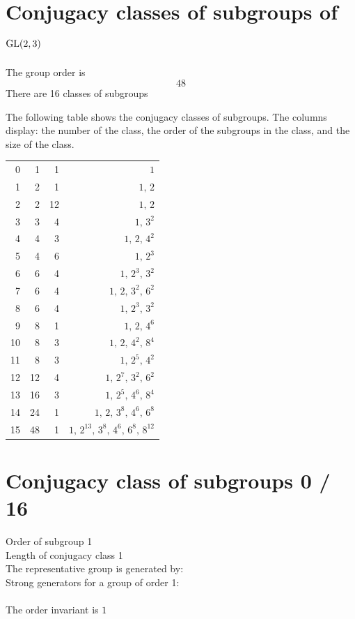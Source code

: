 \section*{Conjugacy classes of subgroups of ${\rm GL}(2,3)$}
The group order is 
$$
48
$$
There are 16 classes of subgroups\\

\bigskip

The following table shows the conjugacy classes of subgroups. The columns display: the number of the class, the order of the subgroups in the class, and the size of the class.\\

\bigskip

\begin{center}
\begin{tabular}{*{4}{r}}
0 & 1 & 1 & $1$\\
1 & 2 & 1 & $1,\,2$\\
2 & 2 & 12 & $1,\,2$\\
3 & 3 & 4 & $1,\,3^2$\\
4 & 4 & 3 & $1,\,2,\,4^2$\\
5 & 4 & 6 & $1,\,2^3$\\
6 & 6 & 4 & $1,\,2^3,\,3^2$\\
7 & 6 & 4 & $1,\,2,\,3^2,\,6^2$\\
8 & 6 & 4 & $1,\,2^3,\,3^2$\\
9 & 8 & 1 & $1,\,2,\,4^6$\\
10 & 8 & 3 & $1,\,2,\,4^2,\,8^4$\\
11 & 8 & 3 & $1,\,2^5,\,4^2$\\
12 & 12 & 4 & $1,\,2^7,\,3^2,\,6^2$\\
13 & 16 & 3 & $1,\,2^5,\,4^6,\,8^4$\\
14 & 24 & 1 & $1,\,2,\,3^8,\,4^6,\,6^8$\\
15 & 48 & 1 & $1,\,2^{13},\,3^8,\,4^6,\,6^8,\,8^{12}$\\
\end{tabular}
\end{center}

\bigskip

\section{Conjugacy class of subgroups 0 / 16}
Order of subgroup 1\\
Length of conjugacy class 1\\
The representative group is generated by:\\
Strong generators for a group of order 1:\\
\\
The order invariant is $1$\\
